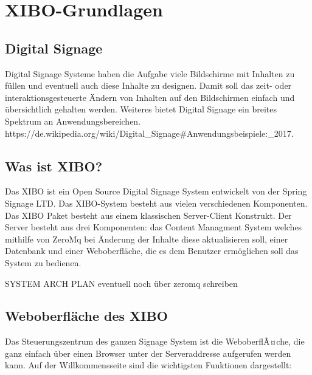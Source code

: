 \chapter{XIBO-Grundlagen}
\section{Digital Signage}\label{sec:digitalsignage}
Digital Signage Systeme haben die Aufgabe viele Bildschirme mit Inhalten zu füllen und eventuell auch diese Inhalte zu designen. Damit soll das zeit- oder interaktionsgesteuerte Ändern von Inhalten auf den Bildschirmen einfach und übersichtlich gehalten werden. Weiteres bietet Digital Signage ein breites Spektrum an Anwendungsbereichen.    https://de.wikipedia.org/wiki/Digital_Signage#Anwendungsbeispiele:_2017.

\section{Was ist XIBO?}\label{sec:xibo}
Das XIBO ist ein Open Source Digital Signage System entwickelt von der Spring Signage LTD. Das XIBO-System besteht aus vielen verschiedenen Komponenten. Das XIBO Paket besteht aus einem klassischen Server-Client Konstrukt. Der Server besteht aus drei Komponenten: das Content Managment System welches mithilfe von ZeroMq bei Änderung der Inhalte diese aktualisieren soll, einer Datenbank und einer Weboberfläche, die es dem Benutzer ermöglichen soll das System zu bedienen.

SYSTEM ARCH PLAN eventuell noch über zeromq schreiben

\section{Weboberfläche des XIBO}\label{sec:webpagexibo}
Das Steuerungszentrum des ganzen Signage System ist die WeboberflÃ¤che, die ganz einfach über einen Browser unter der Serveraddresse aufgerufen werden kann. Auf der Willkommensseite sind die wichtigsten Funktionen dargestellt:

